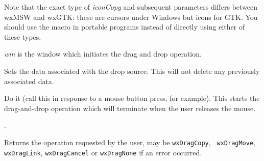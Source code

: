 Note that the exact type of {\it iconCopy} and subsequent parameters differs
between wxMSW and wxGTK: these are cursors under Windows but icons for GTK.
You should use the macro  in portable
programs instead of directly using either of these types.






{\it win} is the window which initiates the drag and drop operation.

\label{wxdropsourcedtor}


\label{wxdropsourcesetdata}


Sets the data  associated with the 
drop source. This will not delete any previously associated data.

\label{wxdropsourcedodragdrop}


Do it (call this in response to a mouse button press, for example). This starts
the drag-and-drop operation which will terminate when the user releases the
mouse.


.


Returns the operation requested by the user, may be {\tt wxDragCopy}, {\tt
wxDragMove}, {\tt wxDragLink}, {\tt wxDragCancel} or {\tt wxDragNone} if an error occurred.


